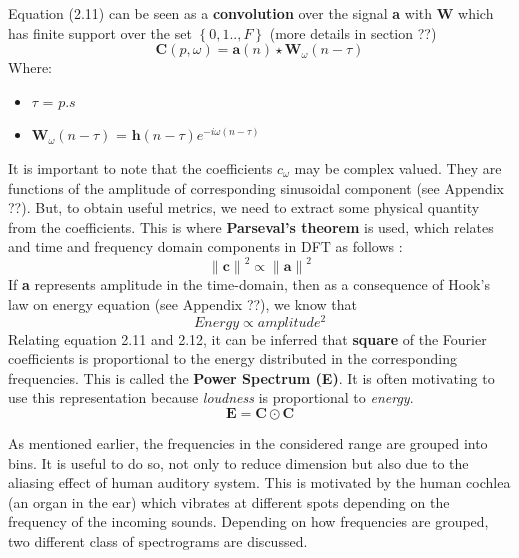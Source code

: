 \noindent Equation (2.11) can be seen as a \textbf{convolution} over the signal \textbf{a} with \textbf{W} which has finite support over the set $\left\{0,1..,F \right\}$ (more details in section ??)
\begin{equation}
\boxed
{
  \textbf{C}(p, \omega ) = \textbf{a}(n) \star \textbf{W}_{\omega}(n- \tau)
}
\end{equation}
Where:
\begin{itemize}[label=]
    \setlength\itemsep{0em}
    \item $ \tau$ = $p.s$
    \item $\textbf{W}_{\omega}(n- \tau)$ = $\textbf{h}(n- \tau )e^{-i \omega (n- \tau)}$
\end{itemize}
It is important to note that the coefficients $c_{\omega}$ may be complex valued. They are functions of the amplitude of corresponding sinusoidal component (see Appendix ??). But, to obtain useful metrics, we need to extract some physical quantity from the coefficients. This is where \textbf{Parseval's theorem} is used, which relates and time and frequency domain components in DFT as follows \cite{allen} :
\begin{equation}
{\|\textbf{c}\|}^2 \propto {\|\textbf{a}\|}^2
\end{equation}
If \textbf{a} represents amplitude in the time-domain, then as a consequence of Hook's law  on energy equation (see Appendix ??), we know that
\begin{equation}
Energy \propto amplitude^2
\end{equation}
Relating equation 2.11 and 2.12, it can be inferred that \textbf{square} of the Fourier coefficients is proportional to the energy distributed in the corresponding frequencies. This is called the \textbf{Power Spectrum (E)}. It is often motivating to use this representation because \textit{loudness} is proportional to \textit{energy}.
\begin{equation}
\textbf{E} = \textbf{C} \odot \textbf{C}
\end{equation}

\noindent As mentioned earlier, the frequencies in the considered range are  grouped into bins. It is useful to do so, not only to reduce dimension but also due to the aliasing effect of human auditory system. This is motivated by the human cochlea (an organ in the ear) which vibrates at different spots depending on the frequency of the incoming sounds. Depending on how frequencies are grouped, two different class of spectrograms are discussed.
  
